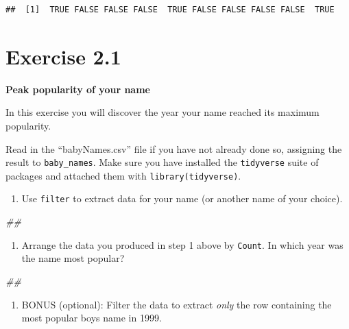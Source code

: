 \documentclass[]{book}
\newenvironment{Shaded}{\begin{snugshade}}{\end{snugshade}}
\newcommand{\CommentTok}[1]{\textcolor[rgb]{0.56,0.35,0.01}{\textit{#1}}}
\providecommand{\tightlist}{%
  \setlength{\itemsep}{0pt}\setlength{\parskip}{0pt}}
\begin{document}
\begin{verbatim}
##  [1]  TRUE FALSE FALSE FALSE  TRUE FALSE FALSE FALSE FALSE  TRUE
\end{verbatim}

\hypertarget{exercise-2.1}{%
\section{Exercise 2.1}\label{exercise-2.1}}

\textbf{Peak popularity of your name}

In this exercise you will discover the year your name reached its maximum popularity.

Read in the ``babyNames.csv'' file if you have not already done so,
assigning the result to \texttt{baby\_names}. Make sure you have installed
the \texttt{tidyverse} suite of packages and attached them with \texttt{library(tidyverse)}.

\begin{enumerate}
\def\labelenumi{\arabic{enumi}.}
\tightlist
\item
  Use \texttt{filter} to extract data for your name (or another name of your choice).
\end{enumerate}

\begin{Shaded}
\begin{Highlighting}[]
\CommentTok{##}
\end{Highlighting}
\end{Shaded}

\begin{enumerate}
\def\labelenumi{\arabic{enumi}.}
\setcounter{enumi}{1}
\tightlist
\item
  Arrange the data you produced in step 1 above by \texttt{Count}.
  In which year was the name most popular?
\end{enumerate}

\begin{Shaded}
\begin{Highlighting}[]
\CommentTok{##}
\end{Highlighting}
\end{Shaded}

\begin{enumerate}
\def\labelenumi{\arabic{enumi}.}
\setcounter{enumi}{2}
\tightlist
\item
  BONUS (optional): Filter the data to extract \emph{only} the
  row containing the most popular boys name in 1999.
\end{enumerate}
\end{document}
